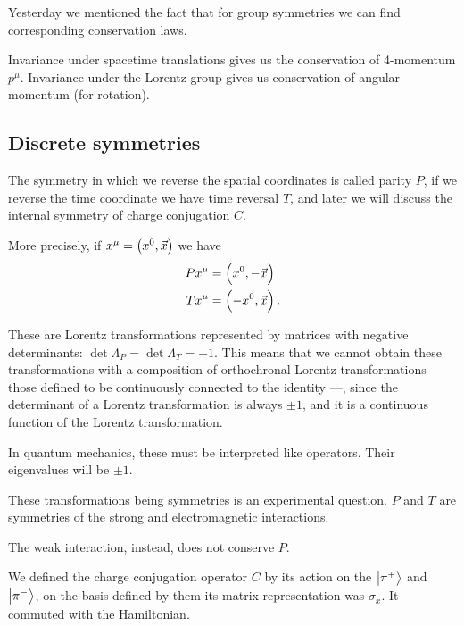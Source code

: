\documentclass[main.tex]{subfiles}
\begin{document}

Yesterday we mentioned the fact that for group symmetries we can find corresponding conservation laws. 

Invariance under spacetime translations gives us the conservation of 4-momentum \(p^{\mu }\). 
Invariance under the Lorentz group gives us conservation of angular momentum (for rotation).


\subsection{Discrete symmetries}

The symmetry in which we reverse the spatial coordinates is called parity \(P\), if we reverse the time coordinate we have time reversal \(T\), and later we will discuss the internal symmetry of charge conjugation \(C\).

More precisely, if \(x^{\mu } = \qty( x^{0}, \vec{x} )\) we have 
%
\begin{subequations}
\begin{align}
P x^{\mu } &= \qty(x^{0}, - \vec{x})  \\
T x^{\mu } &= \qty(-x^{0}, \vec{x})
\,.
\end{align}
\end{subequations}

These are Lorentz transformations represented by matrices with negative determinants: \(\det \Lambda_{P} = \det \Lambda_{T} = -1\). 
This means that we cannot obtain these transformations with a composition of orthochronal Lorentz transformations --- those defined to be continuously connected to the identity ---, since the determinant of a Lorentz transformation is always \(\pm 1\), and it is a continuous function of the Lorentz transformation. 

In quantum mechanics, these must be interpreted like operators. 
Their eigenvalues will be \(\pm 1\). 

These transformations being symmetries is an experimental question. \(P\) and \(T\) are symmetries of the strong and electromagnetic interactions. 

The weak interaction, instead, does not conserve \(P\). 

We defined the charge conjugation operator \(C\) by its action on the \(\ket{\pi^{+}}\) and \(\ket{\pi^{-}}\), on the basis defined by them its matrix representation was \(\sigma_{x}\). 
It commuted with the Hamiltonian. 
\end{document}
